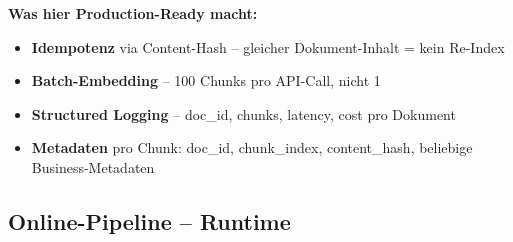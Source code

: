 \textbf{Was hier Production-Ready macht:}
\begin{itemize}[leftmargin=*]
    \item \textbf{Idempotenz} via Content-Hash -- gleicher Dokument-Inhalt = kein Re-Index
    \item \textbf{Batch-Embedding} -- 100 Chunks pro API-Call, nicht 1
    \item \textbf{Structured Logging} -- doc\_id, chunks, latency, cost pro Dokument
    \item \textbf{Metadaten} pro Chunk: doc\_id, chunk\_index, content\_hash, beliebige Business-Metadaten
\end{itemize}

\subsection{Online-Pipeline -- Runtime}

